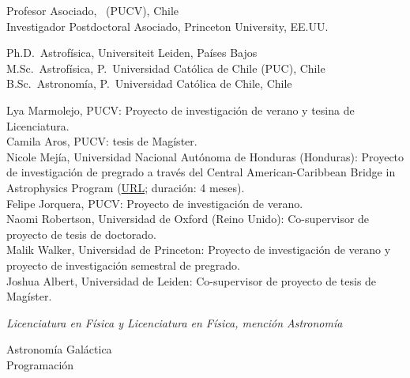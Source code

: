 \documentclass[11pt]{article}
\begin{document}

\noindent
{} Profesor Asociado, \pucv\ (PUCV), Chile\\
 Investigador Postdoctoral Asociado, Princeton University, EE.UU.



\noindent
{} Ph.D.~Astrofísica, Universiteit Leiden, Países Bajos\\
 M.Sc.~Astrofísica, P.~Universidad Cat\'olica de Chile (PUC), Chile\\
 B.Sc.~Astronomía, P.~Universidad Cat\'olica de Chile, Chile\\




 Lya Marmolejo, PUCV: Proyecto de investigación de 
verano y tesina de Licenciatura.\\
 Camila Aros, PUCV: tesis de Magíster.\\
 Nicole Mej\'ia, Universidad Nacional Aut\'onoma de Honduras 
(Honduras): Proyecto de investigación de pregrado a través del Central American-Caribbean Bridge in Astrophysics Program
    (\href{https://cencabridgeastro.weebly.com/our-team.html}{URL}; duración: 4 meses).\\
 Felipe Jorquera, PUCV: Proyecto de investigación de verano.\\
 Naomi Robertson, Universidad de Oxford (Reino Unido): 
Co-supervisor de proyecto de tesis de doctorado.\\
 Malik Walker, Universidad de Princeton: Proyecto de 
investigación de verano y proyecto de investigación semestral de pregrado.\\
 Joshua Albert, Universidad de Leiden: Co-supervisor de 
proyecto de tesis de Magíster.



\noindent
\emph{Licenciatura en Física y Licenciatura en Física, mención Astronomía}

 Astronomía Galáctica\\
 Programación\\
\end{document}
